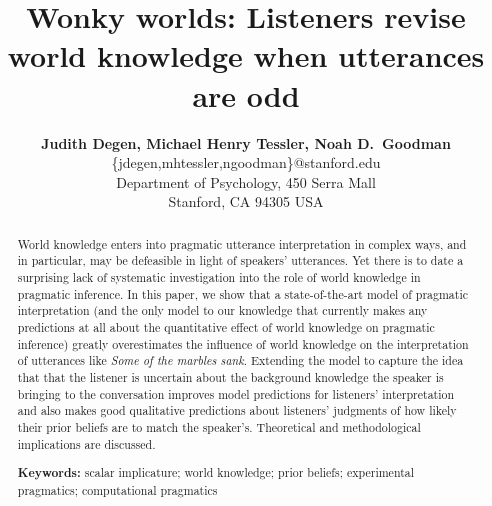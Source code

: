 \documentclass[10pt,letterpaper]{article}
\title{Wonky worlds: Listeners revise world knowledge when utterances are odd}
\author{{\large \bf Judith Degen, Michael Henry Tessler, Noah D.~Goodman} \\
  \{jdegen,mhtessler,ngoodman\}@stanford.edu\\
  Department of Psychology, 450 Serra Mall \\
  Stanford, CA 94305 USA}
\newcommand{\red}[1]{\textcolor{Red}{#1}}
\begin{document}
\maketitle


\begin{abstract}
World knowledge enters into pragmatic utterance interpretation in complex ways, and in particular, may be defeasible in light of speakers' utterances.  Yet there is to date a surprising lack of systematic investigation into the role of world knowledge in pragmatic inference. In this paper, we show that a state-of-the-art model of pragmatic interpretation (and the only model to our knowledge that currently makes any predictions at all about the quantitative effect of world knowledge on pragmatic inference) greatly overestimates the influence of world knowledge on the interpretation of utterances like \emph{Some of the marbles sank}. Extending the model to capture the idea that that the listener is uncertain about the background knowledge the speaker is bringing to the conversation improves model predictions for listeners' interpretation and also makes good qualitative predictions about listeners' judgments of how likely their prior beliefs are to match the speaker's. Theoretical and methodological implications are discussed.


\textbf{Keywords:} 
scalar implicature; world knowledge; prior beliefs; experimental pragmatics; computational pragmatics
\end{abstract}
\end{document}
